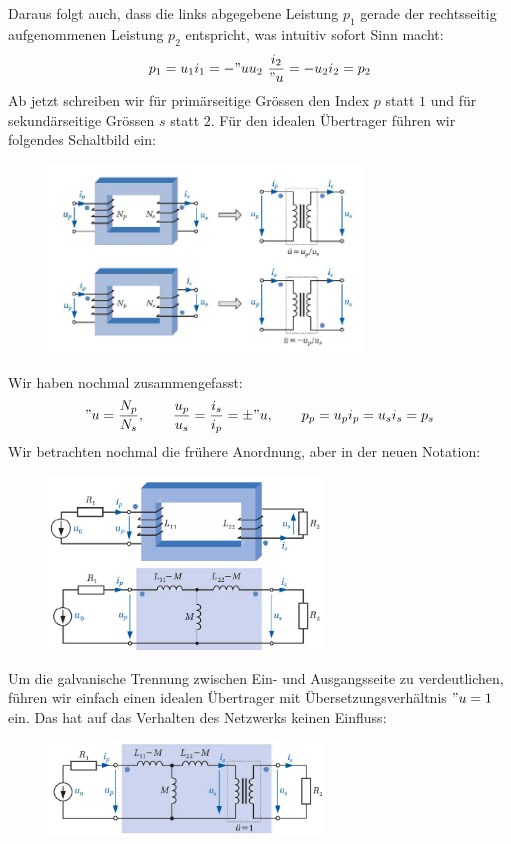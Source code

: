 Daraus folgt auch, dass die links abgegebene Leistung $p_1$ gerade der rechtsseitig aufgenommenen Leistung $p_2$ entspricht, was intuitiv sofort Sinn macht:
$$p_1 = u_1i_1 = -"u u_2~\frac{i_2}{"u} = -u_2 i_2 = p_2$$
Ab jetzt schreiben wir für primärseitige Grössen den Index $p$ statt $1$ und für sekundärseitige Grössen $s$ statt $2$. Für den idealen Übertrager führen wir folgendes Schaltbild ein:
\begin{figure}[H]
\center
\includegraphics[width=0.75\textwidth]{img/Tra5}
\vspace{-0.2cm}
\end{figure}
Wir haben nochmal zusammengefasst:
$$"u = \frac{N_p}{N_s},\qquad \frac{u_p}{u_s} = \frac{i_s}{i_p} = \pm"u, \qquad p_p=u_pi_p=u_si_s=p_s$$
Wir betrachten nochmal die frühere Anordnung, aber in der neuen Notation:
\begin{figure}[H]
\center
\includegraphics[width=0.65\textwidth]{img/Tra6}
\vspace{-0.2cm}
\end{figure}
Um die galvanische Trennung zwischen Ein- und Ausgangsseite zu verdeutlichen, führen wir einfach einen idealen Übertrager mit Übersetzungsverhältnis $"u=1$ ein. Das hat auf das Verhalten des Netzwerks keinen Einfluss:
\begin{figure}[H]
\center
\includegraphics[width=0.65\textwidth]{img/Tra7}
\vspace{-0.2cm}
\end{figure}
